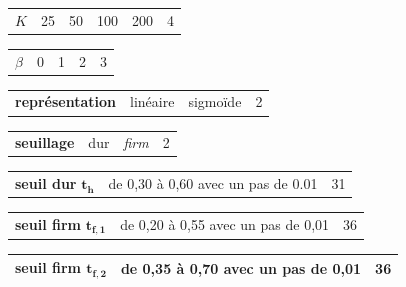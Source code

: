 \begin{table}[h]
\begin{tabularx}{17.5cm}{L{3cm}@{}C{3cm}@{}@{}C{3cm}@{}@{}C{3cm}@{}@{}C{3cm}@{}C{2cm}@{}}
    $K$ & 25 & 50 & 100 & 200 & 4\\
\end{tabularx}

\begin{tabularx}{17.5cm}{L{3cm}@{}C{4cm}@{}@{}C{4cm}@{}@{}C{4cm}@{}C{2cm}@{}}
   $\beta$ & 0 & 1 & 2 & 3\\
\end{tabularx}

\begin{tabularx}{17.5cm}{L{3cm}@{}C{6cm}@{}@{}C{6cm}@{}C{2cm}@{}}
   \textbf{représentation} & linéaire & sigmoïde & 2\\
\end{tabularx}

\begin{tabularx}{17.5cm}{L{3cm}@{}C{6cm}@{}@{}C{6cm}@{}C{2cm}@{}}
   \textbf{seuillage} & dur & \textit{firm} & 2\\
\end{tabularx}

\begin{tabularx}{17.5cm}{L{3cm}@{}C{12cm}@{}C{2cm}@{}}
	\textbf{seuil dur} $\mathbf{t_h}$ & de 0,30 à 0,60 avec un pas de 0.01 & 31\\
\end{tabularx}

\begin{tabularx}{17.5cm}{L{3cm}@{}C{12cm}@{}C{2cm}@{}}
   \textbf{seuil firm} $\mathbf{t_{f,1}}$ & de 0,20 à 0,55 avec un pas de 0,01 & 36\\
\end{tabularx}

\begin{tabularx}{17.5cm}{L{3cm}@{}C{12cm}@{}C{2cm}@{}}
   \textbf{seuil firm} $\mathbf{t_{f,2}}$ & de 0,35 à 0,70 avec un pas de 0,01 & 36\\
   \bottomrule
\end{tabularx}
\label{tab:experimental_factorsNMF_ambiance}
\end{table}

